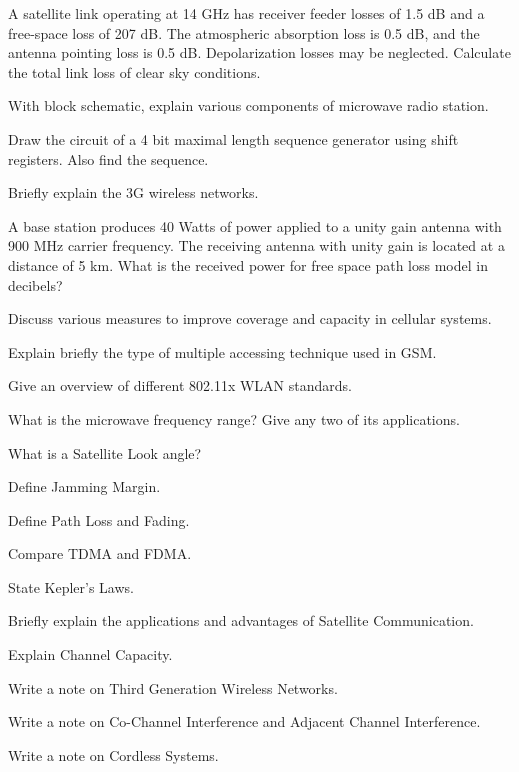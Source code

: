 \markB

\newpage \again

\partCo

\item \iitem A satellite link operating at 14 GHz has receiver feeder losses of 1.5 dB and a free-space
  loss of 207 dB. The atmospheric absorption loss is 0.5 dB, and the antenna pointing loss is 0.5 dB.
  Depolarization losses may be neglected. Calculate the total  link loss of clear sky conditions.
\Or
\item With block schematic, explain various components of microwave radio station.
\ene

\item \iitem Draw the circuit of a 4 bit maximal length sequence generator using shift registers.
  Also find the sequence.
\Or
\item Briefly explain the 3G wireless networks.
\ene

\item \iitem A base station produces 40 Watts of power applied to a unity gain antenna with 900 MHz carrier
  frequency. The receiving antenna with unity gain is located at a distance of 5 km.
  What is the received power for free space path loss model in decibels?
\Or
\item Discuss various measures to improve coverage and capacity in cellular systems.
\ene

\item \iitem Explain briefly the type of multiple accessing technique used in GSM.
\Or
\item Give an overview of different 802.11x WLAN standards.
\ene

\markC
\ene

\newpage

\sub{\subj}
\maxtime

\partA

\iitem What is the microwave frequency range? Give any two of its applications.
\item What is a Satellite Look angle?
\item Define Jamming Margin.
\item Define Path Loss and Fading.
\item Compare TDMA and FDMA.

\markA
\partB

\item State Kepler's Laws.
\item Briefly explain the applications and advantages of Satellite Communication.
\item Explain Channel Capacity.
\item Write a note on Third Generation Wireless Networks.
\item Write a note on Co-Channel Interference and Adjacent Channel Interference.
\item Write a note on Cordless Systems.

